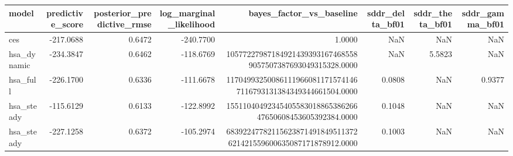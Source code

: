 \begin{tabular}{lrrrrrrr}
\toprule
model & predictive\_score & posterior\_predictive\_rmse & log\_marginal\_likelihood & bayes\_factor\_vs\_baseline & sddr\_delta\_bf01 & sddr\_theta\_bf01 & sddr\_gamma\_bf01 \\
\midrule
ces & -217.0688 & 0.6472 & -240.7700 & 1.0000 & NaN & NaN & NaN \\
hsa\_dynamic & -234.3847 & 0.6462 & -118.6769 & 105772279871849214393931674685589057507387693049315328.0000 & NaN & 5.5823 & NaN \\
hsa\_full & -226.1700 & 0.6336 & -111.6678 & 117049932500861119660811715741467116793131384349344661504.0000 & 0.0808 & NaN & 0.9377 \\
hsa\_steady & -115.6129 & 0.6133 & -122.8992 & 1551104049234540558301886538626647650608453605392384.0000 & 0.1048 & NaN & NaN \\
hsa\_steady & -227.1258 & 0.6372 & -105.2974 & 68392247782115623871491849511372621421559600635087171878912.0000 & 0.1003 & NaN & NaN \\
\bottomrule
\end{tabular}
